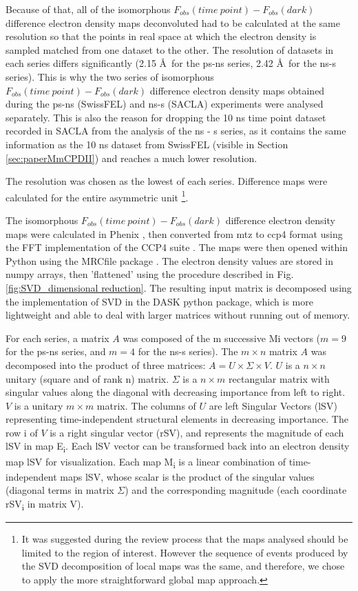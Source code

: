 Because of that, all of the isomorphous \(F_{obs}(time\ point) - F_{obs}(dark)\) difference electron density maps deconvoluted had to be calculated at the same resolution so that the points in real space at which the electron density is sampled matched from one dataset to the other. The resolution of datasets in each series differs significantly (2.15 \AA\ for the ps-ns series, 2.42 \AA\ for the ns-\textmu s series). This is why the two series of isomorphous \(F_{obs}(time\ point) - F_{obs}(dark)\) difference electron density maps obtained during the ps-ns (SwissFEL) and ns-\textmu s (SACLA) experiments were analysed separately. This is also the reason for dropping the 10 ns time point dataset recorded in SACLA from the analysis of the ns - \textmu s series, as it contains the same information as the 10 ns dataset from SwissFEL (visible in Section \ref{sec:paperMmCPDII}) and reaches a much lower resolution. 

The resolution was chosen as the lowest of each series. Difference maps were calculated for the entire asymmetric unit \footnote{It was suggested during the review process that the maps analysed should be limited to the region of interest. However the sequence of events produced by the SVD decomposition of local maps was the same, and therefore, we chose to apply the more straightforward global map approach.}. 

The isomorphous \(F_{obs}(time\ point) - F_{obs}(dark)\) difference electron density maps were calculated in Phenix \parencite{liebschnerMacromolecularStructureDetermination2019}, then converted from mtz to ccp4 format using the FFT implementation of the CCP4 suite \parencite{agirreCCP4SuiteIntegrative2023}. The maps were then opened within Python using the MRCfile package \parencite{burnleyRecentDevelopmentsCCPEM2017}.  The electron density values are stored in numpy arrays, then 'flattened' using the procedure described in Fig. \ref{fig:SVD_dimensional reduction}. The resulting input matrix is decomposed using the implementation of SVD in the DASK python package, which is more lightweight and able to deal with larger matrices without running out of memory. 

For each series, a matrix \(A\) was composed of the m successive Mi vectors (\(m = 9\) for the ps-ns series, and \(m = 4\) for the ns-\textmu s series). The \(m \times n\) matrix \(A\) was decomposed into the product of three matrices: \(A=U\times \Sigma \times V\). \(U\) is a \(n \times n\) unitary (square and of rank n) matrix. \(\Sigma\) is a \(n \times m\) rectangular matrix with singular values along the diagonal with decreasing importance from left to right. \(V\) is a unitary \(m \times m\) matrix. The columns of \(U\) are left Singular Vectors (lSV) representing time-independent structural elements in decreasing importance. The row i of \(V\) is a right singular vector (rSV), and represents the magnitude of each lSV in map E\textsubscript{i}. Each lSV vector can be transformed back into an electron density map lSV for visualization. Each map M\textsubscript{i} is a linear combination of time-independent maps lSV, whose scalar is the product of the singular values (diagonal terms in matrix \(\Sigma\)) and the corresponding magnitude (each coordinate rSV\textsubscript{i} in matrix V). 

